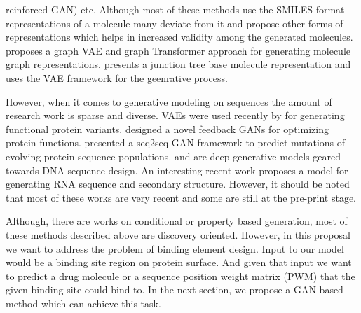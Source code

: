 reinforced GAN) etc. Although most of these methods use the SMILES format representations of a
molecule many deviate from it and propose other forms of representations which helps in increased
validity among the generated molecules. \citet{mitton2021graph} proposes a graph VAE and graph
Transformer \citep{vaswani2017attention} approach for generating molecule graph representations.
\citet{jin2018junction} presents a junction tree base molecule representation and uses the VAE
framework for the geenrative process.
\par
However, when it comes to generative modeling on sequences the amount of research work is sparse and
diverse. VAEs were used recently by \citet{hawkins2021generating} for generating functional protein
variants. \citet{gupta2018feedback} designed a novel feedback GANs for optimizing protein functions.
\citet{berman2020mutagan} presented a seq2seq GAN framework to predict mutations of evolving protein
sequence populations. \citet{linder2020generative} and \citet{killoran2017generating} are deep
generative models geared towards DNA sequence design. An interesting recent work
\citet{yan2021neural} proposes a model for generating RNA sequence and secondary structure. However,
it should be noted that most of these works are very recent and some are still at the pre-print
stage. 
\par
Although, there are works on conditional or property based generation, most of these methods
described above are discovery oriented. However, in this proposal we want to address the problem of
binding element design. Input to our model would be a binding site region on protein surface. And
given that input we want to predict a drug molecule or a sequence position weight matrix (PWM) that
the given binding site could bind to. In the next section, we propose a GAN based method which can
achieve this task.

